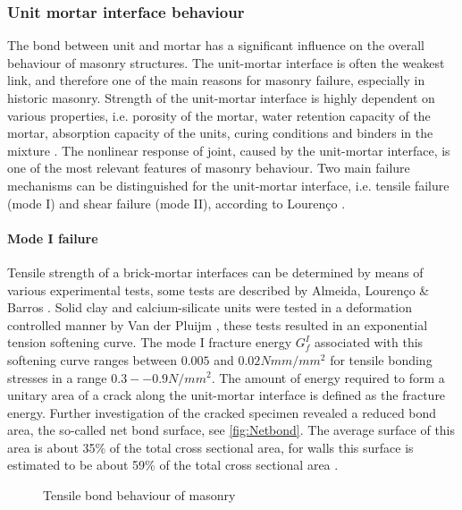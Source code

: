 \subsubsection{Unit mortar interface behaviour}
The bond between unit and mortar has a significant influence on the overall behaviour of masonry structures. The unit-mortar interface is often the weakest link, and therefore one of the main reasons for masonry failure, especially in historic masonry. Strength of the unit-mortar interface is highly dependent on various properties, i.e. porosity of the mortar, water retention capacity of the mortar, absorption capacity of the units, curing conditions and binders in the mixture \cite{bakeer2009collapse}. The nonlinear response of joint, caused by the unit-mortar interface, is one of the most relevant features of masonry behaviour. Two main failure mechanisms can be distinguished for the unit-mortar interface, i.e. tensile failure (mode I) and shear failure (mode II), according to Louren{\c{c}}o \cite{lourenco1996}.

\paragraph{Mode I failure}
Tensile strength of a brick-mortar interfaces can be determined by means of various experimental tests, some tests are described by Almeida, Louren{\c{c}}o \& Barros \cite{almeida2002}. Solid clay and calcium-silicate units were tested in a deformation controlled manner by Van der Pluijm \cite{pluijm1992}, these tests resulted in an exponential tension softening curve. The mode I fracture energy $G^{I}_{f}$ associated with this softening curve ranges between $0.005$ and $0.02 Nmm/mm^2$ for tensile bonding stresses in a range $0.3 -- 0.9 N/mm^2$. The amount of energy required to form a unitary area of a crack along the unit-mortar interface is defined as the fracture energy. Further investigation of the cracked specimen revealed a reduced bond area, the so-called net bond surface, see \autoref{fig:Netbond}. The average surface of this area is about 35\% of the total cross sectional area, for walls this surface is estimated to be about 59\% of the total cross sectional area \cite{lourenco1996}. 

\begin{figure}[!htb]
    \centering
     \hspace{3em}
    \caption{Tensile bond behaviour of masonry \cite{lourenco1996}}
    \label{fig:Mode1}
\end{figure}

